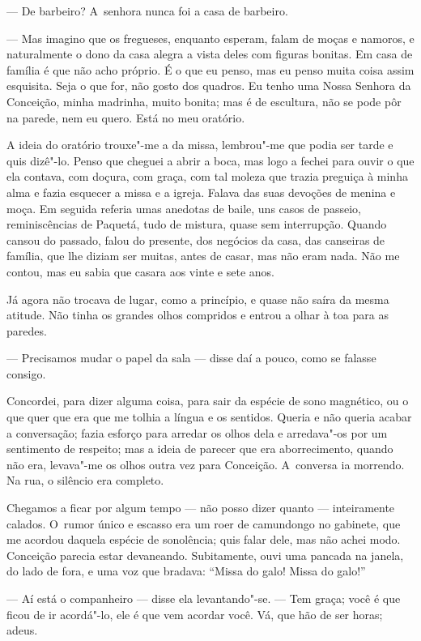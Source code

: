 \begin{linenumbers}
--- De barbeiro? A~senhora nunca foi a casa de barbeiro.

--- Mas imagino que os fregueses, enquanto esperam, falam de moças e
namoros, e naturalmente o dono da casa alegra a vista deles com figuras
bonitas. Em casa de família é que não acho próprio. É o que eu penso,
mas eu penso muita coisa assim esquisita. Seja o que for, não gosto dos
quadros. Eu tenho uma Nossa Senhora da Conceição, minha madrinha, muito
bonita; mas é de escultura, não se pode pôr na parede, nem eu quero.
Está no meu oratório.

A ideia do oratório trouxe"-me a da missa, lembrou"-me que podia ser tarde
e quis dizê"-lo. Penso que cheguei a abrir a boca, mas logo a fechei para
ouvir o que ela contava, com doçura, com graça, com tal moleza que
trazia preguiça à minha alma e fazia esquecer a missa e a igreja. Falava
das suas devoções de menina e moça. Em seguida referia umas anedotas de
baile, uns casos de passeio, reminiscências de Paquetá, tudo de mistura,
quase sem interrupção. Quando cansou do passado, falou do presente, dos
negócios da casa, das canseiras de família, que lhe diziam ser muitas,
antes de casar, mas não eram nada. Não me contou, mas eu sabia que
casara aos vinte e sete anos.

Já agora não trocava de lugar, como a princípio, e quase não saíra da
mesma atitude. Não tinha os grandes olhos compridos e entrou a olhar à
toa para as paredes.

--- Precisamos mudar o papel da sala --- disse daí a pouco, como se
falasse consigo.

Concordei, para dizer alguma coisa, para sair da espécie de sono
magnético, ou o que quer que era que me tolhia a língua e os sentidos.
Queria e não queria acabar a conversação; fazia esforço para arredar os
olhos dela e arredava"-os por um sentimento de respeito; mas a ideia de
parecer que era aborrecimento, quando não era, levava"-me os olhos outra
vez para Conceição. A~conversa ia morrendo. Na rua, o silêncio era
completo.

Chegamos a ficar por algum tempo --- não posso dizer quanto ---
inteiramente calados. O~rumor único e escasso era um roer de camundongo
no gabinete, que me acordou daquela espécie de sonolência; quis falar
dele, mas não achei modo. Conceição parecia estar devaneando.
Subitamente, ouvi uma pancada na janela, do lado de fora, e uma voz que
bradava: ``Missa do galo! Missa do galo!''

--- Aí está o companheiro --- disse ela levantando"-se. --- Tem graça; você
é que ficou de ir acordá"-lo, ele é que vem acordar você. Vá, que hão de
ser horas; adeus.


\end{linenumbers}
